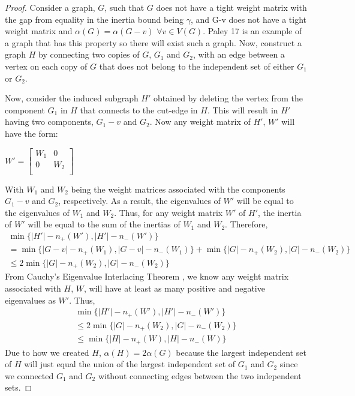 \documentclass[12pt]{article}
\theoremstyle{parenbold}
\begin{document}
\begin{proof}
Consider a graph, $G$, such that $G$ does not have a tight weight matrix with the gap from equality in the inertia bound being $\gamma$, and G-v does not have a tight weight matrix and $\alpha(G) = \alpha(G-v)$ $\forall v \in V(G)$. Paley 17 is an example of a graph that has this property so there will exist such a graph. Now, construct a graph $H$ by connecting two copies of $G$, $G_1$ and $G_2$, with an edge between a vertex on each copy of $G$ that does not belong to the independent set of either $G_1$ or $G_2$.

Now, consider the induced subgraph $H'$ obtained by deleting the vertex from the component $G_1$ in $H$ that connects to the cut-edge in $H$. This will result in $H'$ having two components, $G_1-v$ and $G_2$. Now any weight matrix of $H'$, $W'$ will have the form:

\begin{center}
$W'=
\begin{bmatrix}
W_1 & 0 \\
0 & W_2 \\
\end{bmatrix}
$
\end{center}

With $W_1$ and $W_2$ being the weight matrices associated with the components $G_1-v$ and $G_2$, respectively. As a result, the eigenvalues of $W'$ will be equal to the eigenvalues of $W_1$ and $W_2$. Thus, for any weight matrix $W'$ of $H'$, the inertia of $W'$ will be equal to the sum of the inertias of $W_1$ and $W_2$. Therefore,
\begin{multline}
\min\{|H'|-n_+(W'), |H'|-n_-(W')\} \\ = \min\{|G-v|-n_+(W_1), |G-v|-n_-(W_1)\} + \min\{|G|-n_+(W_2), |G|-n_-(W_2)\} \\ \leq 2\min\{|G|-n_+(W_2), |G|-n_-(W_2)\}
\end{multline}
From Cauchy's Eigenvalue Interlacing Theorem , we know any weight matrix associated with $H$, $W$, will have at least as many positive and negative eigenvalues as $W'$. Thus,
\begin{multline}
\min\{|H'|-n_+(W'), |H'|-n_-(W')\} \\ \leq 2\min\{|G|-n_+(W_2), |G|-n_-(W_2)\} \\ \leq \min\{|H|-n_+(W), |H|-n_-(W)\}
\end{multline}
Due to how we created $H$, $\alpha(H) = 2\alpha(G)$ because the largest independent set of $H$ will just equal the union of the largest independent set of $G_1$ and $G_2$ since we connected $G_1$ and $G_2$ without connecting edges between the two independent sets.


\end{proof}
\end{document}
